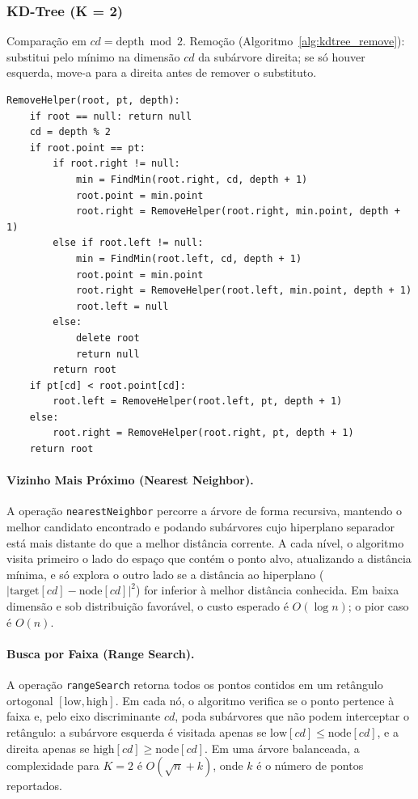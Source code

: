 \documentclass[11pt, a4paper]{article}
\begin{document}
\subsubsection{KD-Tree (K = 2)}
Comparação em $cd=\mathrm{depth}\bmod 2$. Remoção (Algoritmo~\ref{alg:kdtree_remove}): substitui pelo mínimo na dimensão $cd$ da subárvore direita; se só houver esquerda, move-a para a direita antes de remover o substituto.

\begin{lstlisting}[caption={Remoção na KD-Tree},label={alg:kdtree_remove}]
RemoveHelper(root, pt, depth):
    if root == null: return null
    cd = depth % 2
    if root.point == pt:
        if root.right != null:
            min = FindMin(root.right, cd, depth + 1)
            root.point = min.point
            root.right = RemoveHelper(root.right, min.point, depth + 1)
        else if root.left != null:
            min = FindMin(root.left, cd, depth + 1)
            root.point = min.point
            root.right = RemoveHelper(root.left, min.point, depth + 1)
            root.left = null
        else:
            delete root
            return null
        return root
    if pt[cd] < root.point[cd]:
        root.left = RemoveHelper(root.left, pt, depth + 1)
    else:
        root.right = RemoveHelper(root.right, pt, depth + 1)
    return root
\end{lstlisting}

\paragraph{Vizinho Mais Próximo (Nearest Neighbor).}
A operação \texttt{nearestNeighbor} percorre a árvore de forma recursiva, mantendo o melhor candidato encontrado e podando subárvores cujo hiperplano separador está mais distante do que a melhor distância corrente. A cada nível, o algoritmo visita primeiro o lado do espaço que contém o ponto alvo, atualizando a distância mínima, e só explora o outro lado se a distância ao hiperplano ($|\mathrm{target}[cd] - \mathrm{node}[cd]|^2$) for inferior à melhor distância conhecida. Em baixa dimensão e sob distribuição favorável, o custo esperado é $O(\log n)$; o pior caso é $O(n)$.

\paragraph{Busca por Faixa (Range Search).}
A operação \texttt{rangeSearch} retorna todos os pontos contidos em um retângulo ortogonal $[\mathrm{low}, \mathrm{high}]$. Em cada nó, o algoritmo verifica se o ponto pertence à faixa e, pelo eixo discriminante $cd$, poda subárvores que não podem interceptar o retângulo: a subárvore esquerda é visitada apenas se $\mathrm{low}[cd] \le \mathrm{node}[cd]$, e a direita apenas se $\mathrm{high}[cd] \ge \mathrm{node}[cd]$. Em uma árvore balanceada, a complexidade para $K=2$ é $O(\sqrt{n} + k)$, onde $k$ é o número de pontos reportados.
\end{document}
